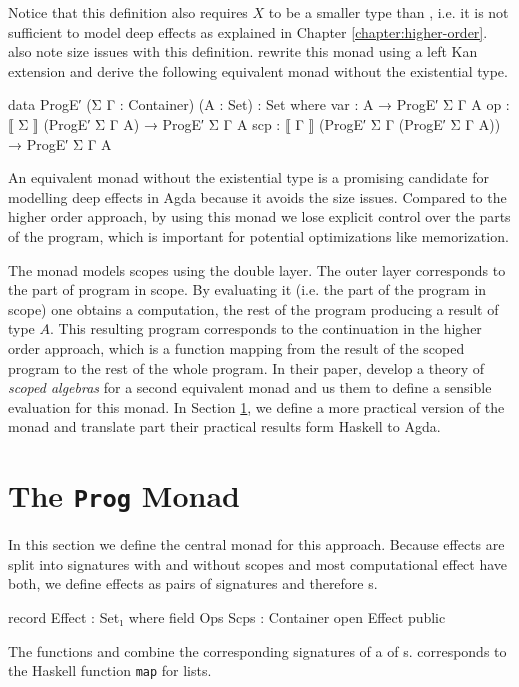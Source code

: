 Notice that this definition also requires $X$ to be a smaller type than
, i.e. it is not sufficient to model deep effects as
explained in Chapter \ref{chapter:higher-order}.
\textcite{DBLP:conf/lics/PirogSWJ18} also note size issues with this definition.
\textcite{DBLP:conf/lics/PirogSWJ18} rewrite this monad using a left Kan
extension and derive the following equivalent monad without the existential
type.

\begin{code}
data ProgE′ (Σ Γ : Container) (A : Set) : Set where
  var  :  A                                   → ProgE′ Σ Γ A
  op   :  ⟦ Σ  ⟧ (ProgE′ Σ Γ A)               → ProgE′ Σ Γ A
  scp  :  ⟦ Γ  ⟧ (ProgE′ Σ Γ (ProgE′ Σ Γ A))  → ProgE′ Σ Γ A
\end{code}
An equivalent monad without the existential type is a promising candidate for
modelling deep effects in Agda because it avoids the size issues.
Compared to the higher order approach, by using this monad we lose explicit
control over the parts of the program, which is important for potential
optimizations like memorization.

The monad models scopes using the double  layer.
The outer layer corresponds to the part of program in scope.
By evaluating it (i.e. the part of the program in scope) one obtains a
computation, the rest of the program producing a result of type $A$.
This resulting program corresponds to the continuation in the higher order
approach, which is a function mapping from the result of the scoped program
to the rest of the whole program.
In their paper, \textcite{DBLP:conf/lics/PirogSWJ18} develop a theory of
\textit{scoped algebras} for a second equivalent monad and us them to define a
sensible evaluation for this monad.
In Section \ref{scoped-algebra:monad}, we define a more practical version of the
monad and translate part their practical results form Haskell to Agda. 


\section{The \texttt{Prog} Monad}
\label{scoped-algebra:monad}

In this section we define the central monad for this approach.
Because effects are split into signatures with and without scopes and most
computational effect have both, we define effects as pairs of signatures and
therefore s.

\begin{code}
record Effect : Set₁ where
  field Ops Scps : Container
open Effect public
\end{code}
The functions  and  combine the
corresponding signatures of a  of s.
 corresponds to the Haskell function \texttt{map} for lists.

